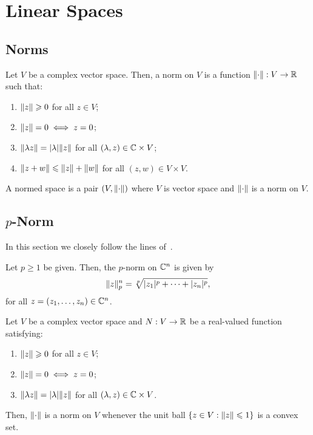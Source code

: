 \section{Linear Spaces}\label{sec:linear-spaces}

\subsection{Norms}\label{subsec:norms}

\begin{definition}\label{def:normed-linear-spaces}
  Let \(V\) be a complex vector space. Then, a norm on \(V\) is a function
  \(\norm:V\to\reals\) such that:
  \begin{enumerate}
    \item
      \(\norm(z)\geqslant{0}\) for all \(z\in{V}\);
    \item
      \(\norm(z)=0\iff{z=0}\);
    \item
      \(\norm(\lambda{z})=\abs{\lambda}\norm(z)\) for all
      \((\lambda,z)\in\mathbb{C}\times{V}\);
    \item
      \(\norm(z+w)\leqslant{\norm(z)+\norm(w)}\) for all
      \((z,w)\in{V\times{V}}\).
  \end{enumerate}
  A normed space is a pair \((V,\norm)\) where \(V\) is vector space and
  \(\norm\) is a norm on \(V\).
\end{definition}

\subsection{\(p\)-Norm}\label{subsec:p-norm}

In this section we closely follow the lines
of~\cite{yet_another_proof_of_minkowskis_inequality}.

\begin{definition}
  Let \(p\geqslant{1}\) be given. Then, the \(p\)-norm on \(\mathbb{C}^{n}\)
  is given by
  \[
    \norm<n>[p](z)
    =
    \sqrt[p]{\abs{z_{1}}^{p}+\cdots+\abs{z_{n}}^{p}},
  \]
  for all \(z=(z_{1},\ldots,z_{n})\in\mathbb{C}^{n}\).
\end{definition}

\begin{lemma}\label{lemma:on-norms-and-the-convexity-of-the-unitary-closed-ball}
  Let \(V\) be a complex vector space and \(N:V\to\mathbb{R}\) be a real-valued
  function satisfying:
  \begin{enumerate}
    \item
      \(\norm(z)\geqslant{0}\) for all \(z\in{V}\);
    \item
      \(\norm(z)=0\iff{z=0}\);
    \item
      \(\norm(\lambda{z})=\abs{\lambda}\norm(z)\) for all
      \((\lambda,z)\in\mathbb{C}\times{V}\).
  \end{enumerate}
  Then, \(\norm\) is a norm on \(V\) whenever the unit ball
  \(\left\{z\in{V}:\norm(z)\leqslant{1}\right\}\) is a convex set.
\end{lemma}

